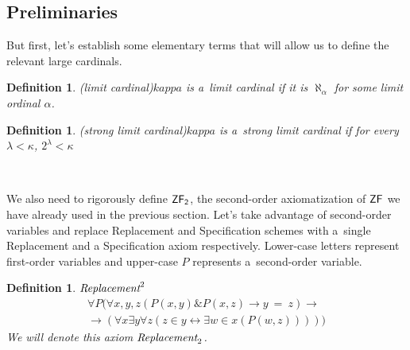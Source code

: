 \documentclass[12pt,a4paper]{article}
\newtheorem{definition}[theorem]{Definition}
\renewcommand{\iff}{\leftrightarrow}
\newcommand{\sub}{\subseteq}
\newcommand{\then}{\rightarrow}
\begin{document}




\subsection{Preliminaries}

But first, let's establish some elementary terms that will allow us to define the relevant large cardinals.

\begin{definition}(limit cardinal)\label{def:limit}
$kappa$ is a~\emph{limit cardinal} if it is $\aleph_\alpha$ for some limit ordinal $\alpha$.
\end{definition}

\begin{definition}(strong limit cardinal)\label{def:strong_limit}
$kappa$ is a~\emph{strong limit cardinal} if for every $\lambda < \kappa$, $2^\lambda < \kappa$
\end{definition}

\

We also need to rigorously define $\sf{ZF}_2$, the second-order axiomatization of $\sf{ZF}$ we have already used in the previous section. Let's take advantage of second-order variables and replace Replacement and Specification schemes with a~single Replacement and a Specification axiom respectively. Lower-case letters represent first-order variables and upper-case $P$ represents a~second-order variable. \cite{Shapiro87}
\begin{definition}{$\emph{Replacement}^2$}\label{def:replacement_2}\\
\begin{equation}
\begin{split}
\forall P (\forall x, y, z (P(x, y) \& P(x, z) \then y\ =\ z) \then
\\
\then (\forall x \exists y \forall z (z \in y \iff \exists w \in x (P(w, z)))))
\end{split}
\end{equation}
We will denote this axiom $\emph{Replacement}_2$.
\end{definition}
\end{document}
